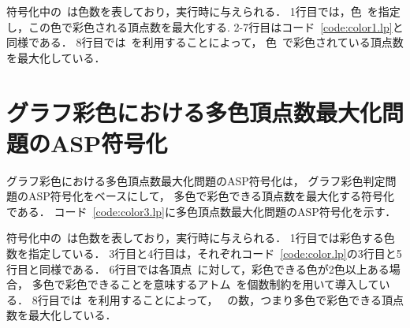符号化中の~は色数を表しており，実行時に与えられる．
1行目では，色~を指定し，この色で彩色される頂点数を最大化する.
2-7行目はコード~\ref{code:color1.lp}と同様である．
8行目では~を利用することによって，
色~で彩色されている頂点数を最大化している．


\section{グラフ彩色における多色頂点数最大化問題のASP符号化}



グラフ彩色における多色頂点数最大化問題のASP符号化は，
グラフ彩色判定問題のASP符号化をベースにして，
多色で彩色できる頂点数を最大化する符号化である．
コード~\ref{code:color3.lp}に多色頂点数最大化問題のASP符号化を示す．

符号化中の~は色数を表しており，実行時に与えられる．
1行目では彩色する色数を指定している．
3行目と4行目は，それぞれコード~\ref{code:color.lp}の3行目と5行目と同様である．
6行目では各頂点~に対して，彩色できる色が2色以上ある場合，
多色で彩色できることを意味するアトム~を個数制約を用いて導入している．
8行目では~を利用することによって，
~の数，つまり多色で彩色できる頂点数を最大化している．

